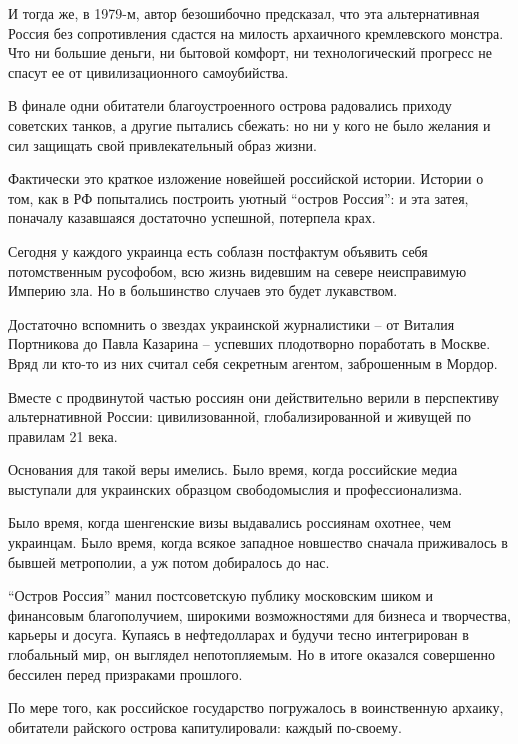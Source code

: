 И тогда же, в 1979-м, автор безошибочно предсказал, что эта альтернативная
Россия без сопротивления сдастся на милость архаичного кремлевского монстра.
Что ни большие деньги, ни бытовой комфорт, ни технологический прогресс не
спасут ее от цивилизационного самоубийства.

В финале одни обитатели благоустроенного острова радовались приходу советских
танков, а другие пытались сбежать: но ни у кого не было желания и сил защищать
свой привлекательный образ жизни.

Фактически это краткое изложение новейшей российской истории. Истории о том,
как в РФ попытались построить уютный \enquote{остров Россия}: и эта затея, поначалу
казавшаяся достаточно успешной, потерпела крах.

\begin{leftbar}
Сегодня у каждого украинца есть соблазн постфактум объявить себя потомственным
русофобом, всю жизнь видевшим на севере неисправимую Империю зла. Но в
большинство случаев это будет лукавством.
\end{leftbar}

Достаточно вспомнить о звездах украинской журналистики – от Виталия Портникова
до Павла Казарина – успевших плодотворно поработать в Москве. Вряд ли кто-то из
них считал себя секретным агентом, заброшенным в Мордор.

Вместе с продвинутой частью россиян они действительно верили в перспективу
альтернативной России: цивилизованной, глобализированной и живущей по правилам
21 века.

Основания для такой веры имелись. Было время, когда российские медиа выступали
для украинских образцом свободомыслия и профессионализма.

Было время, когда шенгенские визы выдавались россиянам охотнее, чем украинцам.
Было время, когда всякое западное новшество сначала приживалось в бывшей
метрополии, а уж потом добиралось до нас.

\enquote{Остров Россия} манил постсоветскую публику московским шиком и финансовым
благополучием, широкими возможностями для бизнеса и творчества, карьеры и
досуга. Купаясь в нефтедолларах и будучи тесно интегрирован в глобальный мир,
он выглядел непотопляемым. Но в итоге оказался совершенно бессилен перед
призраками прошлого.

\begin{leftbar}
По мере того, как российское государство погружалось в воинственную архаику,
обитатели райского острова капитулировали: каждый по-своему.
\end{leftbar}

